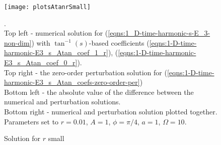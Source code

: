 \documentclass[12pt,twoside]{report}
\newtheorem{thm}{Theorem}[subsection]
\begin{document}
\begin{figure}
\begin{center}
\texttt{[image: plotsAtanrSmall]}
\end{center}
\caption {Solution for $r$ small }.\\
Top left - numerical solution for (\ref{eqns:1_D-time-harmonic-s-E_3-non-dim}) with $\tan^{-1}(s)$-based coefficients (\ref{eqns:1-D-time-harmonic-E3_s_Atan_coef_1_r}), (\ref{eqns:1-D-time-harmonic-E3_s_Atan_coef_0_r}).\\
Top right - the zero-order perturbation solution for (\ref{eqns:1-D-time-harmonic-E3_s_Atan_coefs-zero-order-per})\\
Bottom left - the absolute value of the difference between the numerical and perturbation solutions.\\
Bottom right - numerical and perturbation solution plotted together.\\ 
Parameters set to $r=0.01$, $A=1$, $\phi = \pi/4$, $a=1$, $\Omega=10$.
\label{fig:plotsAtanrSmall}
\end{figure}


\begin{comment}

\subsubsection{Passage to a Sturm-form BVP}
Equation (\ref{eqns:1-D-time-harmonic-E3_z}) is a linear, homogeneous real valued variable coefficients second order ODE. We can estimate its solution's period of oscillation using Sturm's comparison theorem \cite{BirkhoffRota1989}:

\begin{thm}
\label{thm:Sturm-Comparison}
Let $f(x)$ and $g(x)$ be nontrivial solutions of the DEs $u''+p(x)u=0$ and $v''+q(x)v=0$, respectively., where $p(x) \geq q(x)$. Then $f(x)$ vanishes at least once between any two zeros of $g(x)$, unless $p(x) \equiv q(x)$ and if $f$ is a constant multiple of $g$. 
\end{thm}
As we can see, the theorem requires the equation's first order derivative coefficient to vanish. Thus equation (\ref{eqns:1-D-time-harmonic-E3_z}) must be transformed to such form. \\
Letting $\hat{E}_3 = \epsilon^{-1/2}u(z)$ we get
\begin{align}
\label{eqns:1-D-harmonic-z-Sturm}
\dfrac{d^2 u}{dz^2} +\dfrac{\omega^2 \epsilon^3(z)-\frac{3}{4}(\epsilon'(z))^2+\frac{1}{2}\epsilon(z)\epsilon''(z)}{\epsilon(z)}u=0
\end{align}
Since $\epsilon(z)$, $\epsilon'(z)$, $\epsilon''(z)$ are bounded and $\epsilon(z)$ is strictly positive, we can take $\omega^2$ large enough so that the right hand side of (\ref{eqns:1-D-harmonic-z-Sturm}) would be larger than $\dfrac{\omega^2}{2\epsilon_2}$ for all $-\delta<z<\delta$.In such case, the solutions for (\ref{eqns:1-D-harmonic-z-Sturm}) oscillate at a frequency of at least $\dfrac{\omega}{2\pi\sqrt{2 \epsilon_2}}$.




\end{comment}
\end{document}

